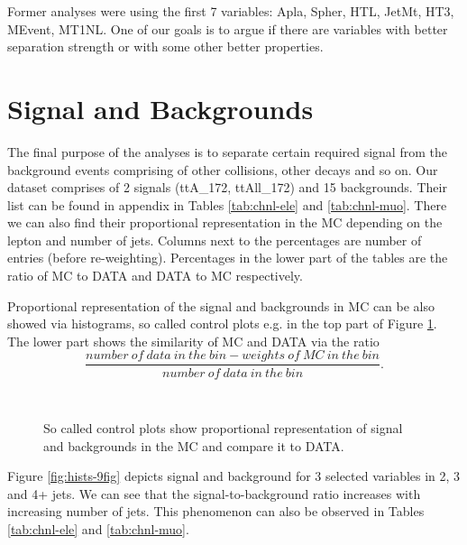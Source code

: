 Former analyses were using the first 7 variables: \textsf{Apla, Spher, HTL, JetMt, HT3, MEvent, MT1NL}. One of our goals is to argue if there are variables with better separation strength or with some other better properties. 

\section{Signal and Backgrounds}


The final purpose of the analyses is to separate certain required signal from the background events comprising of other collisions, other decays and so on. Our dataset comprises of 2 signals (\textsf{ttA\_172, ttAll\_172}) and 15 backgrounds. Their list can be found in appendix in Tables \ref{tab:chnl-ele} and \ref{tab:chnl-muo}. There we can also find their proportional representation in the MC depending on the lepton and number of jets. Columns next to the percentages are number of entries (before re-weighting). Percentages in the lower part of the tables are the ratio of MC to DATA and DATA to MC respectively.

Proportional representation of the signal and backgrounds in MC can be also showed via histograms, so called control plots e.g. in the top part of Figure \ref{fig:contrPlots}. The lower part shows the similarity of MC and DATA via the ratio
\begin{equation*}
\frac{number\:of\:data\:in\:the\:bin - weights\:of\:MC\:in\:the\:bin}{number\:of\:data\:in\:the\:bin}.
\end{equation*}

\begin{figure}[thb]
  \centering
  \\
  \caption{So called control plots show proportional representation of signal and backgrounds in the MC and compare it to DATA.}
  \label{fig:contrPlots}
\end{figure} 

Figure \ref{fig:hists-9fig} depicts signal and background for 3 selected variables in 2, 3 and 4+ jets. We can see that the signal-to-background ratio increases with increasing number of jets. This phenomenon  can also be observed in Tables \ref{tab:chnl-ele} and \ref{tab:chnl-muo}. 
